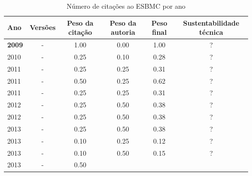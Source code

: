\begin{table}[H]
\caption{Número de citações ao ESBMC  por ano}
\centering
\begin{tabular}{| l | c | c | c | c | c |}
  \hline
  Ano & Versões & Peso da citação & Peso da autoria & Peso final & Sustentabilidade técnica \\
  \hline
            {\bf 2009}
          &
          -
          &
          1.00
          &
          0.00
          &
            {\color{blue} 1.00}
          &
          ?
          \\
\hline
            2010
          &
          -
          &
          0.25
          &
          0.10
          &
            {\color{red} 0.28}
          &
          ?
          \\
\hline
            2011
          &
          -
          &
          0.25
          &
          0.25
          &
            {\color{red} 0.31}
          &
          ?
          \\
            2011
          &
          -
          &
          0.50
          &
          0.25
          &
            {\color{blue} 0.62}
          &
          ?
          \\
            2011
          &
          -
          &
          0.25
          &
          0.25
          &
            {\color{red} 0.31}
          &
          ?
          \\
\hline
            2012
          &
          -
          &
          0.25
          &
          0.50
          &
            {\color{red} 0.38}
          &
          ?
          \\
            2012
          &
          -
          &
          0.25
          &
          0.50
          &
            {\color{red} 0.38}
          &
          ?
          \\
\hline
            2013
          &
          -
          &
          0.25
          &
          0.50
          &
            {\color{red} 0.38}
          &
          ?
          \\
            2013
          &
          -
          &
          0.10
          &
          0.25
          &
            {\color{red} 0.12}
          &
          ?
          \\
            2013
          &
          -
          &
          0.10
          &
          0.50
          &
            {\color{red} 0.15}
          &
          ?
          \\
            2013
          &
          -
          &
          0.50

\end{tabular}
\end{table}
